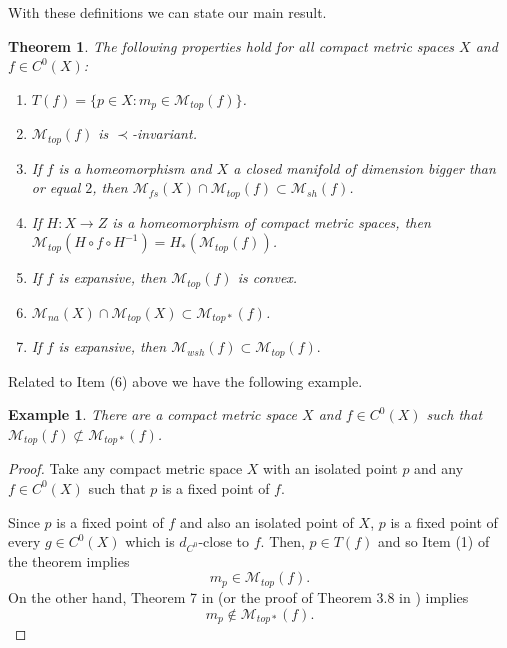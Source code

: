 \documentclass[11pt,letterpaper]{amsart}
\theoremstyle{plain}
\newtheorem*{theorem}{Theorem}
\newtheorem{example}{Example}
\begin{document}
With these definitions we can state our main result.

\begin{theorem}
The following properties hold for all compact metric spaces $X$ and $f\in C^0(X)$:

\begin{enumerate}
\item
$T(f)=\{p\in X:m_p\in\mathcal{M}_{top}(f)\}$.

\medskip

\item
$\mathcal{M}_{top}(f)$ is $\prec$-invariant.

\medskip

\item
If $f$ is a homeomorphism and $X$ a closed manifold of dimension bigger than or equal $2$,
then $\mathcal{M}_{fs}(X)\cap \mathcal{M}_{top}(f)\subset \mathcal{M}_{sh}(f)$.

\medskip

\item
If $H:X\to Z$ is a homeomorphism of compact metric spaces, then
$\mathcal{M}_{top}(H\circ f\circ H^{-1})=H_*(\mathcal{M}_{top}(f))$.

\medskip

\item
If $f$ is expansive, then $\mathcal{M}_{top}(f)$ is convex.

\medskip

\item
$\mathcal{M}_{na}(X)\cap \mathcal{M}_{top}(X)\subset\mathcal{M}_{top*}(f)$.

\medskip

\item
If $f$ is expansive,
then
$
\mathcal{M}_{wsh}(f)\subset \mathcal{M}_{top}(f).
$ 
\end{enumerate}
\end{theorem}

Related to Item (6) above we have the following example.


\begin{example}
\label{basicas}
There are a compact metric space $X$ and $f\in C^0(X)$
such that $\mathcal{M}_{top}(f)\not\subset \mathcal{M}_{top*}(f)$.
\end{example}

\begin{proof}
Take any compact metric space $X$ with an isolated point $p$
and any $f\in C^0(X)$ such that $p$ is a fixed point of $f$.

Since $p$ is a fixed point of $f$ and also an isolated point of $X$, $p$ is a fixed point of every $g\in C^0(X)$ which is $d_{C^0}$-close to $f$.
Then, $p\in T(f)$ and so Item (1) of the theorem implies
$$
m_p\in\mathcal{M}_{top}(f).
$$
On the other hand, Theorem 7 in \cite{lr} (or the proof of Theorem 3.8 in \cite{lm}) implies
$$
m_p\notin \mathcal{M}_{top*}(f).
$$
\end{proof}
\end{document}

